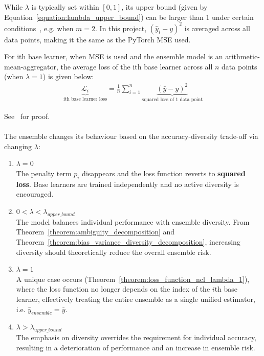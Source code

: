 While $\lambda$ is typically set within $[0, 1]$, its upper bound (given by Equation~\ref{equation:lambda_upper_bound}) can be larger than $1$ under certain conditions~\cite{brown2005managing}, e.g. when $m = 2$. In this project, $(\hat{y}_i - y)^2$ is averaged across all data points, making it the same as the PyTorch MSE used. 

\begin{theorem}\label{theorem:loss_function_ncl_lambda_1}
    For ith base learner, when MSE is used and the ensemble model is an arithmetic-mean-aggregator, the average loss of the ith base learner across all $n$ data points (when $\lambda = 1$) is given below: 
    \begin{align*}
        \underbrace{\mathcal{L}_i}_{\text{ith base learner loss}} = \frac{1}{n} \sum^{n}_{i = 1} \underbrace{(\bar{y} - y)^2}_{\text{squared loss of 1 data point}}
    \end{align*}
\end{theorem}
See~\cite{brown2003negative} for proof. 
\\
\\
The ensemble changes its behaviour based on the accuracy-diversity trade-off via changing $\lambda$: 
\begin{enumerate}
    \item \textbf{$\lambda = 0$} \\
    The penalty term $p_i$ disappears and the loss function reverts to \textbf{squared loss}. Base learners are trained independently and no active diversity is encouraged. 

    \item \textbf{$0 < \lambda < \lambda_{upper\_bound}$} \\
    The model balances individual performance with ensemble diversity. From Theorem~\ref{theorem:ambiguity_decomposition} and Theorem~\ref{theorem:bias_variance_diversity_decomposition}, increasing diversity should theoretically reduce the overall ensemble risk. 

    \item \textbf{$\lambda = 1$} \\
    A unique case occurs (Theorem~\ref{theorem:loss_function_ncl_lambda_1}), where the loss function no longer depends on the index of the $i$th base learner, effectively treating the entire ensemble as a single unified estimator, i.e. $\hat{y}_{ensemble} = \bar{y}$. 

    \item \textbf{$\lambda > \lambda_{upper\_bound}$} \\
    The emphasis on diversity overrides the requirement for individual accuracy, resulting in a deterioration of performance and an increase in ensemble risk. 
\end{enumerate}

